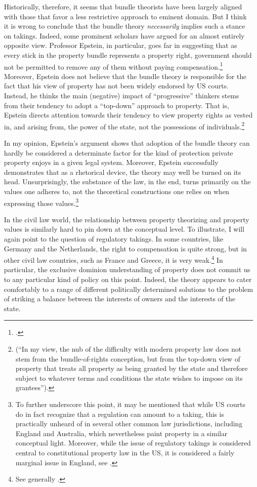 \documentclass[12pt,a4paper]{book} %
\begin{document}
Historically, therefore, it seems that bundle theorists have been largely aligned with those that favor a less restrictive approach to eminent domain. But I think it is wrong to conclude that the bundle theory {\it necessarily} implies such a stance on takings. Indeed, some prominent scholars have argued for an almost entirely opposite view. Professor Epstein, in particular, goes far in suggesting that as every stick in the property bundle represents a property right, government should not be permitted to remove any of them without paying compensation.\footcite[232-233]{epstein11} Moreover, Epstein does not believe that the bundle theory is responsible for the fact that his view of property has not been widely endorsed by US courts. Instead, he thinks the main (negative) impact of ``progressive'' thinkers stems from their tendency to adopt a ``top-down'' approach to property. That is, Epstein directs attention towards their tendency to view property rights as vested in, and arising from, the power of the state, not the possessions of individuals.\footnote{\cite[227-228]{epstein11} (``In my view, the nub of the difficulty with modern property law does not stem from the bundle-of-rights conception, but from the top-down view of property that treats all property as being granted by the state and therefore subject to whatever terms and conditions the state wishes to impose on its grantees'').} 

In my opinion, Epstein's argument shows that adoption of the bundle theory can hardly be considered a determinate factor for the kind of protection private property enjoys in a given legal system. Moreover, Epstein successfully demonstrates that as a rhetorical device, the theory may well be turned on its head. Unsurprisingly, the substance of the law, in the end, turns primarily on the values one adheres to, not the theoretical constructions one relies on when expressing those values.\footnote{To further underscore this point, it may be mentioned that while US courts do in fact recognize that a regulation can amount to a taking, this is practically unheard of in several other common law jurisdictions, including England and Australia, which nevertheless paint property in a similar conceptual light. Moreover, while the issue of regulatory takings is considered central to constitutional property law in the US, it is considered a fairly marginal issue in England, see \cite{purdue10}.}

In the civil law world, the relationship between property theorizing and property values is similarly hard to pin down at the conceptual level. To illustrate, I will again point to the question of regulatory takings. In some countries, like Germany and the Netherlands, the right to compensation is quite strong, but in other civil law countries, such as France and Greece, it is very weak.\footnote{See generally \cite{alterman10}.} In particular, the exclusive dominion understanding of property does not commit us to any particular kind of policy on this point. Indeed, the theory appears to cater comfortably to a range of different politically determined solutions to the problem of striking a balance between the interests of owners and the interests of the state. 
\end{document}
